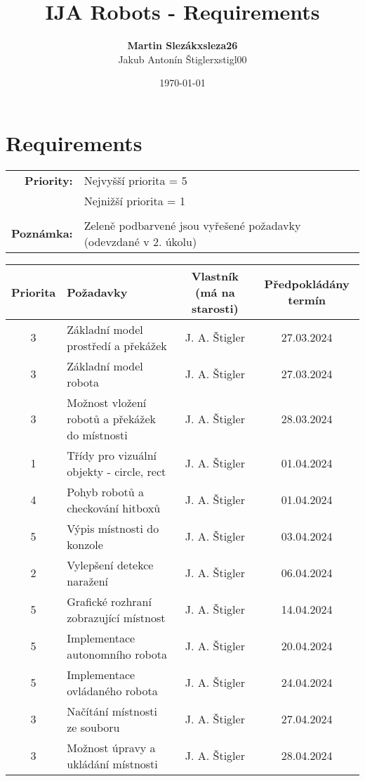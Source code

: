 \documentclass{article}
\title{IJA Robots - Requirements}
\author{
    \begin{tabular}{r l}
        \textbf{Martin Slezák} & \textbf{xsleza26} \\
        Jakub Antonín Štigler  & xstigl00
    \end{tabular}
}
\date{\today}
\begin{document}
\maketitle

\newpage

\section{Requirements}
\begin{tabular}{r l}
    \textbf{Priority:} & Nejvyšší priorita = 5 \\
        & Nejnižší priorita = 1 \\ \\
    \textbf{Poznámka:} &
        \cellcolor{green!30}Zeleně podbarvené jsou vyřešené požadavky
            (odevzdané v 2. úkolu)
\end{tabular}

\vspace{\baselineskip}

\begin{table}[h]
    \centering
    \begin{tabular}{ |c|>{\raggedright\arraybackslash}p{4cm}|c|c| }
        \hline
        \rowcolor{blue!25}Priorita & Požadavky & Vlastník (má na starosti) &
            Předpokládány termín \\
        \hline
        \rowcolor{green!25}3 & Základní model prostředí a překážek &
            J. A. Štigler & 27.03.2024 \\
        \hline
        \rowcolor{green!25}3 & Základní model robota & J. A. Štigler &
            27.03.2024 \\
        \hline
        \rowcolor{green!25}3 & Možnost vložení robotů a překážek do místnosti &
            J. A. Štigler & 28.03.2024 \\
        \hline
        \rowcolor{green!25}1 & Třídy pro vizuální objekty - circle, rect &
            J. A. Štigler & 01.04.2024 \\
        \hline
        \rowcolor{green!25}4 & Pohyb robotů a checkování hitboxů &
            J. A. Štigler & 01.04.2024 \\
        \hline
        \rowcolor{green!25}5 & Výpis místnosti do konzole & J. A. Štigler &
            03.04.2024 \\
        \hline
        2 & Vylepšení detekce naražení & J. A. Štigler & 06.04.2024 \\
        \hline
        5 & Grafické rozhraní zobrazující místnost & J. A. Štigler &
            14.04.2024 \\
        \hline
        5 & Implementace autonomního robota & J. A. Štigler & 20.04.2024 \\
        \hline
        5 & Implementace ovládaného robota & J. A. Štigler & 24.04.2024 \\
        \hline
        3 & Načítání místnosti ze souboru & J. A. Štigler & 27.04.2024 \\
        \hline
        3 & Možnost úpravy a ukládání místnosti & J. A. Štigler & 28.04.2024 \\
        \hline
    \end{tabular}
\end{table}
\end{document}
